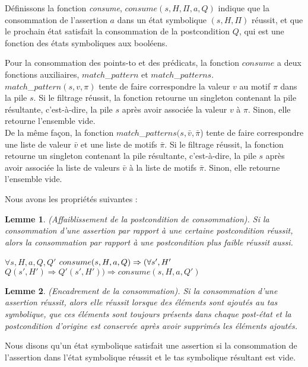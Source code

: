 \documentclass[11pt,openany]{article}
\newtheorem{lemme}{Lemme}
\begin{document}
	D\'efinissons la fonction \textit{consume}, $consume(s,H,\Pi,a,Q)$ indique que la consommation de l'assertion $a$ dans un \'etat symbolique $(s,H,\Pi)$ r\'eussit, et que le prochain \'etat satisfait la consommation de la postcondition $Q$, qui est une fonction des \'etats symboliques aux bool\'eens.
	
	Pour la consommation des points-to et des pr\'edicats, la fonction $consume$ a deux fonctions auxiliaires, $match$_$pattern$ et $match$_$patterns$.\\ $match$_$pattern(s,v,\pi)$ tente de faire correspondre la valeur $v$ au motif $\pi$ dans la pile $s$. Si le filtrage r\'eussit, la fonction retourne un singleton contenant la pile r\'esultante, c'est-\`a-dire, la pile $s$ apr\`es avoir associ\'ee la valeur $v$ \`a $\pi$. Sinon, elle retourne l'ensemble vide.\\
	De la m\^eme fa\c{c}on, la fonction $match$_$patterns(s,\bar{v},\bar{\pi}$) tente de faire correspondre une liste de valeur $\bar{v}$ et une liste de motifs $\bar{\pi}$. Si le filtrage r\'eussit, la fonction retourne un singleton contenant la pile r\'esultante, c'est-\`a-dire, la pile $s$ apr\`es avoir associ\'ee la liste de valeurs $\bar{v}$ \`a la liste de motifs $\bar{\pi}$. Sinon, elle retourne l'ensemble vide.
	
	Nous avons les propri\'et\'es suivantes :	
	
	\begin{lemme}
		(Affaiblissement de la postcondition de consommation). Si la consommation d'une assertion par rapport \`a une certaine postcondition  r\'eussit, alors la consommation par rapport \`a une postcondition plus faible r\'eussit aussi.
		
$\forall s,H,a,Q,Q'$ $consume(s,H,a,Q)\Rightarrow\\(\forall s', H'$ $Q(s',H')\Rightarrow Q'(s',H'))\Rightarrow consume(s,H,a,Q')$
	\end{lemme}
	
	\begin{lemme}
		(Encadrement de la consommation). Si la consommation d'une assertion r\'eussit, alors elle r\'eussit lorsque des \'el\'ements sont ajout\'es au tas symbolique, que ces \'el\'ements sont toujours pr\'esents dans chaque post-\'etat et la postcondition d'origine est conserv\'ee apr\`es avoir supprim\'es les \'el\'ements ajout\'es.
	\end{lemme}
	Nous disons qu'un \'etat symbolique satisfait une assertion si la consommation de l'assertion dans l'\'etat symbolique r\'eussit et le tas symbolique r\'esultant est vide.\\
	
\end{document}
